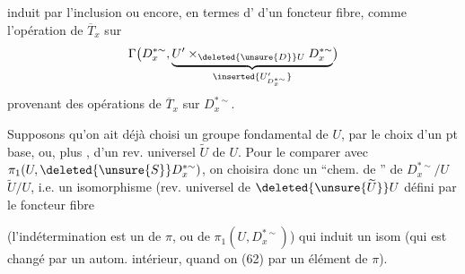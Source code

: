 induit par l'inclusion
ou encore,  en termes d' d'un foncteur fibre, comme l'opération de $\overline T_x$ sur
\[
\Gamma\bigl(D_x^{*\sim},\underbrace{U'\mathbin{\times}_{\deleted{\unsure{D}}U}D_x^{*\sim}}_{\inserted{U'_{D_x^{*\sim}}}}\bigr)
\]
provenant des opérations de $\overline T_x$ sur $D_x^{*\sim}$.

Supposons qu'on ait déjà choisi  un groupe fondamental  de $U$, par le choix d'un pt base, ou, plus , d'un rev. universel $\widetilde U$ de $U$.
Pour le comparer avec $\pi_1(U,\deleted{\unsure{S}}D_x^{*\sim})$, on choisira donc un ``chem. de '' de $D_x^{*\sim}/U$  $\widetilde U/U$, i.e. un isomorphisme
(rev. universel de $\deleted{\unsure{\widetilde U}}U$ défini par le foncteur fibre

(l'indétermination est  un    de $\pi$, ou de $\pi_1(U,D_x^{*\sim})$) qui induit un isom
(qui est changé par un autom. intérieur, quand on  (62) par un élément de $\pi$).

